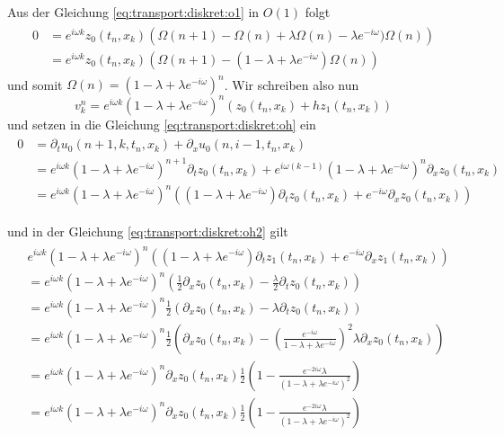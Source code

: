 Aus der Gleichung \eqref{eq:transport:diskret:o1} in $O(1)$ folgt
\begin{align} 
\begin{split}
0 &= e^{i \omega k} z_0(t_n, x_k) \left( \Omega(n+1) - \Omega(n) + \lambda \Omega(n) - \lambda e^{-i \omega}) \Omega(n) \right)\\
&= e^{i \omega k} z_0(t_n, x_k) \left(\Omega(n+1) - (1 - \lambda + \lambda e^{-i \omega}) \Omega(n) \right)
\end{split}
\end{align}
und somit $\Omega(n) = (1 - \lambda + \lambda e^{-i \omega})^n$. Wir schreiben also nun 
\[ 
v^n_k = e^{i \omega k} (1 - \lambda + \lambda e^{-i \omega})^n \left( z_0(t_n, x_k) + h z_1(t_n, x_k) \right)
\]
und setzen in die Gleichung \eqref{eq:transport:diskret:oh} ein
\begin{align}
\begin{split}
0 &= \partial_t u_0(n+1, k, t_n, x_k) + \partial_x u_0(n, i-1, t_n, x_k)\\
&= e^{i \omega k} (1 - \lambda + \lambda e^{-i \omega})^{n+1} \partial_t z_0(t_n, x_k) + e^{i \omega (k-1)} (1 - \lambda + \lambda e^{-i \omega})^n \partial_x z_0(t_n, x_k)\\
&= e^{i \omega k} (1 - \lambda + \lambda e^{-i \omega})^{n} \left( (1 - \lambda + \lambda e^{-i \omega}) \partial_t z_0(t_n, x_k) + e^{- i \omega} \partial_x z_0(t_n, x_k) \right)
\end{split}
\end{align}

und in der Gleichung \eqref{eq:transport:diskret:oh2} gilt
\begin{align}
\begin{split}
&e^{i \omega k} (1 - \lambda + \lambda e^{-i \omega})^{n} \left( (1 - \lambda + \lambda e^{-i \omega}) \partial_t z_1(t_n, x_k) + e^{- i \omega} \partial_x z_1(t_n, x_k) \right)\\
&= e^{i \omega k} (1 - \lambda + \lambda e^{-i \omega})^{n} \left( \frac{1}{2} \partial_x z_0(t_n, x_k) - \frac{\lambda}{2} \partial_t z_0(t_n, x_k) \right)\\
&= e^{i \omega k} (1 - \lambda + \lambda e^{-i \omega})^{n} \frac{1}{2} \left( \partial_x z_0(t_n, x_k) - \lambda \partial_t z_0(t_n, x_k) \right)\\
&= e^{i \omega k} (1 - \lambda + \lambda e^{-i \omega})^{n} \frac{1}{2} \left( \partial_x z_0(t_n, x_k) - \left( \frac{e^{- i \omega}}{1 - \lambda + \lambda e^{-i \omega}} \right)^2 \lambda \partial_x z_0(t_n, x_k) \right)\\
&= e^{i \omega k} (1 - \lambda + \lambda e^{-i \omega})^{n} \partial_x z_0(t_n, x_k) \frac{1}{2} \left( 1 - \frac{e^{- 2 i \omega} \lambda}{(1 - \lambda + \lambda e^{-i \omega})^2}  \right)\\
&= e^{i \omega k} (1 - \lambda + \lambda e^{-i \omega})^{n} \partial_x z_0(t_n, x_k) \frac{1}{2} \left( 1 - \frac{e^{- 2 i \omega} \lambda}{(1 - \lambda + \lambda e^{-i \omega})^2}  \right)\\
\end{split}
\end{align}